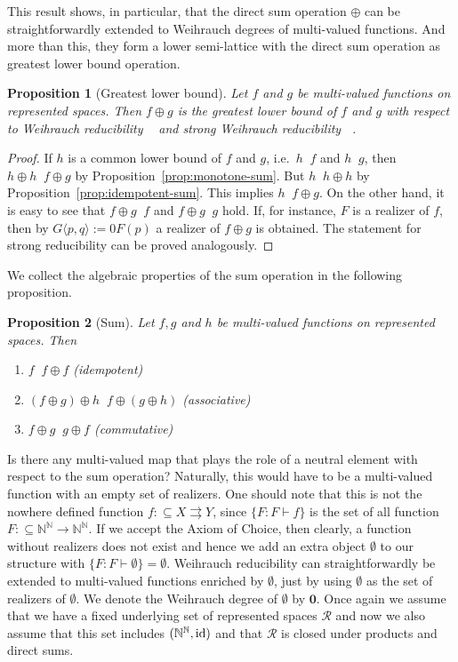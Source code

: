 \documentclass[jsl,10pt]{noasl}
\def\RR{{\mathcal R}}
\def\IN{{\mathbb{N}}}
\def\In{\subseteq}
\def\mto{\rightrightarrows}
\def\id{{\rm id}}
\def\leqW{\mathop{\leq_{\mathrm{W}}}}
\def\equivW{\mathop{\equiv_{\mathrm{W}}}}
\def\leqSW{\mathop{\leq_{\mathrm{sW}}}}
\def\equivSW{\mathop{\equiv_{\mathrm{sW}}}}
\def\topW{\mathbf{0}}
\def\emptyW{\boldsymbol{\emptyset}}
\newtheorem{proposition}{Proposition}[section]
\begin{document}
This result shows, in particular, that the direct sum operation $\oplus$ can
be straightforwardly extended to Weihrauch degrees of multi-valued functions.
And more than this, they form a lower semi-lattice with the direct sum operation as
greatest lower bound operation.

\begin{proposition}[Greatest lower bound]
\label{prop:greatest-lower-bound}
Let $f$ and $g$ be multi-valued functions on represented spaces.
Then $f\oplus g$ is the greatest lower bound of $f$ and $g$
with respect to Weihrauch reducibility $\leqW$ and strong
Weihrauch reducibility $\leqSW$.
\end{proposition}
\begin{proof}
If $h$ is a common lower bound of $f$ and $g$, i.e.\ $h\leqW f$ and $h\leqW g$,
then $h\oplus h\leqW f\oplus g$ by Proposition~\ref{prop:monotone-sum}.
But $h\equivW h\oplus h$ by Proposition~\ref{prop:idempotent-sum}.
This implies $h\leqW f\oplus g$.
On the other hand, it is easy to see that $f\oplus g\leqW f$ and $f\oplus g\leqW g$ hold.
If, for instance, $F$ is a realizer of $f$, then by $G\langle p,q\rangle:=0F(p)$ a realizer
of $f\oplus g$ is obtained.
The statement for strong reducibility can be proved analogously.
\end{proof}

We collect the algebraic properties of the sum operation in the following proposition.

\begin{proposition}[Sum]
\label{prop:sum}
Let $f,g$ and $h$ be multi-valued functions on represented spaces. Then
\begin{enumerate}
\item $f\equivSW f\oplus f$ \hfill (idempotent)
\item $(f\oplus g)\oplus h\equivSW f\oplus(g\oplus h)$ \hfill (associative)
\item $f\oplus g\equivSW g\oplus f$ \hfill (commutative)
\end{enumerate}
\end{proposition}

Is there any multi-valued map that plays the role of a neutral element 
with respect to the sum operation?
Naturally, this would have to be a multi-valued function with an empty set of realizers.
One should note that this is not the nowhere defined function $f:\In X\mto Y$,
since $\{F:F\vdash f\}$ is the set of all function $F:\In\IN^\IN\to\IN^\IN$.
If we accept the Axiom of Choice, then clearly, a function without realizers does not exist and hence we add an extra
object $\emptyW$ to our structure with $\{F:F\vdash\emptyW\}=\emptyset$. 
Weihrauch reducibility can straightforwardly be extended to multi-valued functions enriched
by $\emptyW$, just by using $\emptyset$ as the set of realizers of $\emptyW$.
We denote the Weihrauch degree of $\emptyW$ by $\topW$.
Once again we assume that we have a fixed underlying set of represented spaces $\RR$
and now we also assume that this set includes $(\IN^\IN,\id)$ and that $\RR$ is closed
under products and direct sums.
\end{document}
